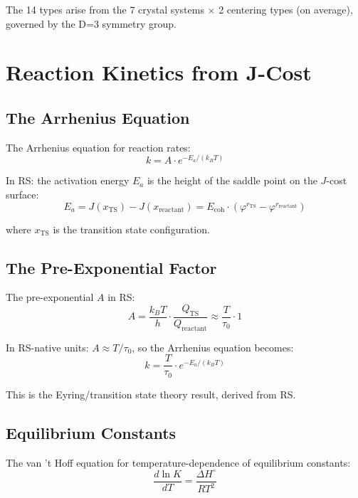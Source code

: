 \documentclass[12pt,a4paper]{article}
\theoremstyle{definition}
\theoremstyle{remark}
\begin{document}
The 14 types arise from the 7 crystal systems × 2 centering types (on average), 
governed by the D=3 symmetry group.

\section{Reaction Kinetics from J-Cost}

\subsection{The Arrhenius Equation}

The Arrhenius equation for reaction rates:
\begin{equation}
k = A \cdot e^{-E_a/(k_B T)}
\end{equation}

In RS: the activation energy $E_a$ is the height of the saddle point on the $J$-cost surface:
\begin{equation}
E_a = J(x_\mathrm{TS}) - J(x_\mathrm{reactant}) = E_\mathrm{coh} \cdot (\varphi^{r_\mathrm{TS}} - \varphi^{r_\mathrm{reactant}})
\end{equation}

where $x_\mathrm{TS}$ is the transition state configuration.

\subsection{The Pre-Exponential Factor}

The pre-exponential $A$ in RS:
\begin{equation}
A = \frac{k_B T}{h} \cdot \frac{Q_\mathrm{TS}}{Q_\mathrm{reactant}} \approx \frac{T}{\tau_0} \cdot 1
\end{equation}

In RS-native units: $A \approx T/\tau_0$, so the Arrhenius equation becomes:
\begin{equation}
k = \frac{T}{\tau_0} \cdot e^{-E_a/(k_B T)}
\end{equation}

This is the Eyring/transition state theory result, derived from RS.

\subsection{Equilibrium Constants}

The van 't Hoff equation for temperature-dependence of equilibrium constants:
\begin{equation}
\frac{d\ln K}{dT} = \frac{\Delta H^\circ}{RT^2}
\end{equation}
\end{document}
